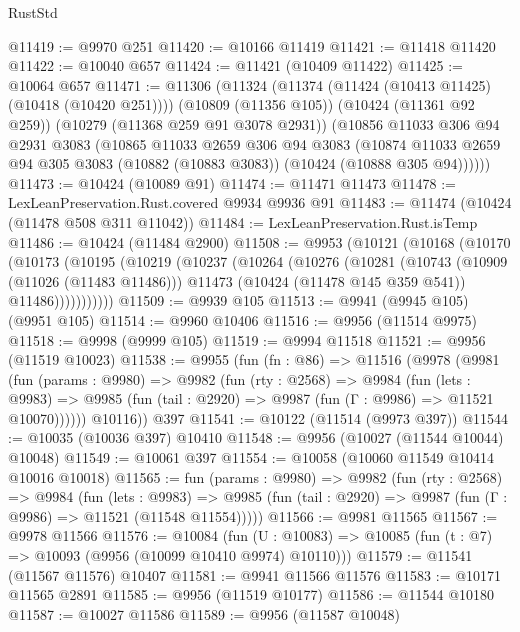 \begin{lexlean}{RustStd}
\begin{coremodule}
@11419 := @9970 @251
@11420 := @10166 @11419
@11421 := @11418 @11420
@11422 := @10040 @657
@11424 := @11421 (@10409 @11422)
@11425 := @10064 @657
@11471 := @11306
    (@11324
      (@11374 (@11424 (@10413 @11425) (@10418 (@10420 @251))))
      (@10809 (@11356 @105))
      (@10424 (@11361 @92 @259))
      (@10279 (@11368 @259 @91 @3078 @2931))
      (@10856
        @11033
        @306
        @94
        @2931
        @3083
        (@10865
          @11033
          @2659
          @306
          @94
          @3083
          (@10874 @11033 @2659 @94 @305 @3083 (@10882 (@10883 @3083)) (@10424 (@10888 @305 @94))))))
@11473 := @10424 (@10089 @91)
@11474 := @11471 @11473
@11478 := LexLeanPreservation.Rust.covered @9934 @9936 @91
@11483 := @11474 (@10424 (@11478 @508 @311 @11042))
@11484 := LexLeanPreservation.Rust.isTemp
@11486 := @10424 (@11484 @2900)
@11508 := @9953
    (@10121
      (@10168
        (@10170
          (@10173
            (@10195
              (@10219
                (@10237
                  (@10264
                    (@10276
                      (@10281
                        (@10743
                          (@10909 (@11026 (@11483 @11486)))
                          @11473
                          (@10424 (@11478 @145 @359 @541))
                          @11486)))))))))))
@11509 := @9939 @105
@11513 := @9941 (@9945 @105) (@9951 @105)
@11514 := @9960 @10406
@11516 := @9956 (@11514 @9975)
@11518 := @9998 (@9999 @105)
@11519 := @9994 @11518
@11521 := @9956 (@11519 @10023)
@11538 := @9955
    (fun (fn : @86) =>
    @11516
      (@9978
        (@9981
          (fun (params : @9980) =>
          @9982
            (fun (rty : @2568) =>
            @9984
              (fun (lets : @9983) =>
              @9985 (fun (tail : @2920) => @9987 (fun (Γ : @9986) => @11521 @10070))))))
        @10116))
    @397
@11541 := @10122 (@11514 (@9973 @397))
@11544 := @10035 (@10036 @397) @10410
@11548 := @9956 (@10027 (@11544 @10044) @10048)
@11549 := @10061 @397
@11554 := @10058 (@10060 @11549 @10414 @10016 @10018)
@11565 := fun (params : @9980) =>
  @9982
    (fun (rty : @2568) =>
    @9984
      (fun (lets : @9983) =>
      @9985 (fun (tail : @2920) => @9987 (fun (Γ : @9986) => @11521 (@11548 @11554)))))
@11566 := @9981 @11565
@11567 := @9978 @11566
@11576 := @10084
    (fun (U : @10083) => @10085 (fun (t : @7) => @10093 (@9956 (@10099 @10410 @9974) @10110)))
@11579 := @11541 (@11567 @11576) @10407
@11581 := @9941 @11566 @11576
@11583 := @10171 @11565 @2891
@11585 := @9956 (@11519 @10177)
@11586 := @11544 @10180
@11587 := @10027 @11586
@11589 := @9956 (@11587 @10048)

\end{coremodule}
\end{lexlean}

